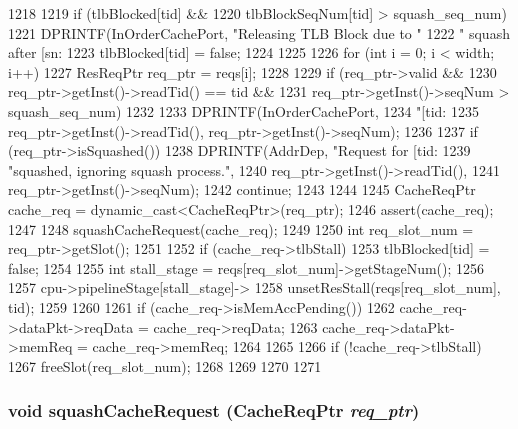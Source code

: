 \begin{DoxyCode}
1218 {
1219     if (tlbBlocked[tid] &&
1220         tlbBlockSeqNum[tid] > squash_seq_num) {
1221         DPRINTF(InOrderCachePort, "Releasing TLB Block due to "
1222                 " squash after [sn:%
1223         tlbBlocked[tid] = false;
1224     }
1225 
1226     for (int i = 0; i < width; i++) {
1227         ResReqPtr req_ptr = reqs[i];
1228 
1229         if (req_ptr->valid &&
1230             req_ptr->getInst()->readTid() == tid &&
1231             req_ptr->getInst()->seqNum > squash_seq_num) {
1232 
1233             DPRINTF(InOrderCachePort,
1234                     "[tid:%
1235                     req_ptr->getInst()->readTid(), req_ptr->getInst()->seqNum);
1236 
1237             if (req_ptr->isSquashed()) {
1238                 DPRINTF(AddrDep, "Request for [tid:%
1239                         "squashed, ignoring squash process.\n",
1240                         req_ptr->getInst()->readTid(),
1241                         req_ptr->getInst()->seqNum);
1242                 continue;                
1243             }
1244 
1245             CacheReqPtr cache_req = dynamic_cast<CacheReqPtr>(req_ptr);
1246             assert(cache_req);
1247 
1248             squashCacheRequest(cache_req);
1249 
1250             int req_slot_num = req_ptr->getSlot();
1251 
1252             if (cache_req->tlbStall) {
1253                 tlbBlocked[tid] = false;
1254 
1255                 int stall_stage = reqs[req_slot_num]->getStageNum();
1256 
1257                 cpu->pipelineStage[stall_stage]->
1258                     unsetResStall(reqs[req_slot_num], tid);
1259             }
1260 
1261             if (cache_req->isMemAccPending()) {
1262                 cache_req->dataPkt->reqData = cache_req->reqData;
1263                 cache_req->dataPkt->memReq = cache_req->memReq;
1264             }
1265 
1266             if (!cache_req->tlbStall)
1267                 freeSlot(req_slot_num);
1268         }
1269     }
1270 
1271 }
\end{DoxyCode}
\hypertarget{classCacheUnit_ac2831520eb121be08811b040992f416b}{
\subsubsection[{squashCacheRequest}]{\setlength{\rightskip}{0pt plus 5cm}void squashCacheRequest ({\bf CacheReqPtr} {\em req\_\-ptr})}}
\label{classCacheUnit_ac2831520eb121be08811b040992f416b}


